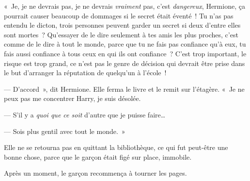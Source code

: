 «~Je, je ne devrais pas, je ne devrais \emph{vraiment} pas, c'est \emph{dangereux}, Hermione, ça pourrait causer beaucoup de dommages si le secret était éventé~!
Tu n'as pas entendu le dicton, trois personnes peuvent garder un secret si deux d'entre elles sont mortes~?
Qu'essayer de le dire seulement à tes amis les plus proches, c'est comme de le dire à tout le monde, parce que tu ne fais pas confiance qu'à eux, tu fais aussi confiance à tous ceux en qui ils ont confiance~?
C'est trop important, le risque est trop grand, ce n'est pas le genre de décision qui devrait être prise dans le but d'arranger la réputation de quelqu'un à l'école~!

--- D'accord~», dit Hermione.
Elle ferma le livre et le remit sur l'étagère.
«~Je ne peux pas me concentrer Harry, je suis désolée.

--- S'il y a \emph{quoi que ce soit} d'autre que je puisse faire…

--- Sois plus gentil avec tout le monde.~»

Elle ne se retourna pas en quittant la bibliothèque, ce qui fut peut-être une bonne chose, parce que le garçon était figé sur place, immobile.

Après un moment, le garçon recommença à tourner les pages.
